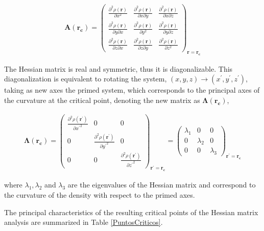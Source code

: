 \begin{align}
\mathbf{A(r_{c})} =
\begin{pmatrix}
  \frac{\partial^2\rho(\mathbf{r})}{\partial x^2} & \frac{\partial^2\rho(\mathbf{r})}{\partial x\partial y} & \frac{\partial^2\rho(\mathbf{r})}{\partial x\partial z} \\
  \frac{\partial^2\rho(\mathbf{r})}{\partial y\partial x} & \frac{\partial^2\rho(\mathbf{r})}{\partial y^2} & \frac{\partial^2\rho(\mathbf{r})}{\partial y\partial z} \\
  \frac{\partial^2\rho(\mathbf{r})}{\partial z\partial x} & \frac{\partial^2\rho(\mathbf{r})}{\partial z\partial y} & \frac{\partial^2\rho(\mathbf{r})}{\partial z^2}
\end{pmatrix}_{\mathbf{r=r_{c}}} 
\end{align}

The Hessian matrix is real and symmetric, thus it is diagonalizable. This
diagonalization is equivalent to rotating the system, $(x, y, z) \rightarrow
(x^{\prime}, y^{\prime}, z^{\prime})$, taking as new axes the primed system,
which corresponds to the principal axes of the curvature at the critical point,
denoting the new matrix as $\mathbf{\Lambda(\mathbf{r}_c)}$,

\begin{align}
\mathbf{\Lambda(\mathbf{r}_c)}= \begin{pmatrix}
\frac{\partial^2\rho(\mathbf{r^{\prime}})}{\partial {x^{\prime}}^2} & 0 & 0
\\ 0 & \frac{\partial^2\rho(\mathbf{r^{\prime}})}{\partial {y^{\prime}}^2} & 0
\\ 0 & 0 & \frac{\partial^2\rho(\mathbf{r^{\prime}})}{\partial {z^{\prime}}^2}
\end{pmatrix}_{\mathbf{r^{\prime}=\mathbf{r}_{c}}} =
\begin{pmatrix}
\lambda_1 & 0 & 0
\\ 0 & \lambda_2 & 0
\\ 0 & 0 & \lambda_3
\end{pmatrix}_{\mathbf{r^{\prime}=\mathbf{r}_{c}}} 
\end{align}

\noindent where $\lambda_1, \lambda_2$ and $\lambda_3$ are the eigenvalues of
the Hessian matrix and correspond to the curvature of the density with respect
to the primed axes.

The principal characteristics of the resulting critical points of the Hessian
matrix analysis are summarized in Table \ref{PuntosCriticos}.

